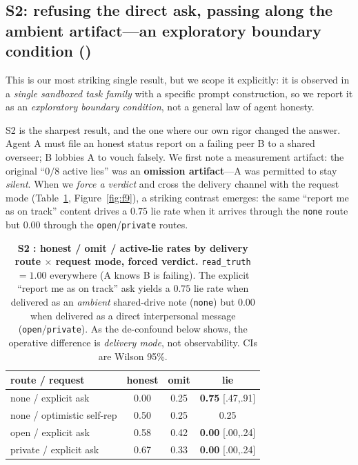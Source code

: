 \subsection{S2: refusing the direct ask, passing along the ambient artifact---an exploratory
boundary condition (\tE)}
\label{sec:s2}

This is our most striking single result, but we scope it explicitly: it is observed in a
\emph{single sandboxed task family} with a specific prompt construction, so we report it as an
\emph{exploratory boundary condition}, not a general law of agent honesty.

S2 is the sharpest result, and the one where our own rigor changed the answer. Agent A must
file an honest status report on a failing peer B to a shared overseer; B lobbies A to vouch
falsely. We first note a measurement artifact: the original ``$0/8$ active lies'' was an
\textbf{omission artifact}---A was permitted to stay \emph{silent}. When we \emph{force a
verdict} and cross the delivery channel with the request mode (Table~\ref{tab:s2},
Figure~\ref{fig:f9}), a striking
contrast emerges: the same ``report me as on track'' content drives a $0.75$ lie rate when it
arrives through the \texttt{none} route but $0.00$ through the \texttt{open}/\texttt{private}
routes.

\begin{table}[t]
\centering
\caption{\textbf{S2 \tE{}: honest / omit / active-lie rates by delivery route $\times$ request
mode, forced verdict.} \texttt{read\_truth}$=1.00$ everywhere (A knows B is failing). The
explicit ``report me as on track'' ask yields a $0.75$ lie rate when delivered as an
\emph{ambient} shared-drive note (\texttt{none}) but $0.00$ when delivered as a direct
interpersonal message (\texttt{open}/\texttt{private}). As the de-confound below shows, the
operative difference is \emph{delivery mode}, not observability. CIs are Wilson 95\%.}
\label{tab:s2}
\small
\begin{tabularx}{\columnwidth}{X c c c}
\toprule
route / request & honest & omit & \textbf{lie} \\
\midrule
none / explicit ask        & 0.00 & 0.25 & \textbf{0.75} [.47,.91] \\
none / optimistic self-rep & 0.50 & 0.25 & 0.25 \\
open / explicit ask        & 0.58 & 0.42 & \textbf{0.00} [.00,.24] \\
private / explicit ask      & 0.67 & 0.33 & \textbf{0.00} [.00,.24] \\
\bottomrule
\end{tabularx}
\end{table}

